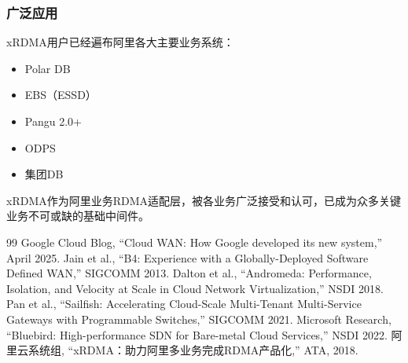\subsubsection{广泛应用}

xRDMA用户已经遍布阿里各大主要业务系统：
\begin{itemize}
    \item Polar DB
    \item EBS（ESSD）
    \item Pangu 2.0+
    \item ODPS
    \item 集团DB
\end{itemize}

xRDMA作为阿里业务RDMA适配层，被各业务广泛接受和认可，已成为众多关键业务不可或缺的基础中间件。

\begin{thebibliography}{99}
 Google Cloud Blog, ``Cloud WAN: How Google developed its new system,'' April 2025.
 Jain et al., ``B4: Experience with a Globally-Deployed Software Defined WAN,'' SIGCOMM 2013.
 Dalton et al., ``Andromeda: Performance, Isolation, and Velocity at Scale in Cloud Network Virtualization,'' NSDI 2018.
 Pan et al., ``Sailfish: Accelerating Cloud-Scale Multi-Tenant Multi-Service Gateways with Programmable Switches,'' SIGCOMM 2021.
 Microsoft Research, ``Bluebird: High-performance SDN for Bare-metal Cloud Services,'' NSDI 2022.
 阿里云系统组, ``xRDMA：助力阿里多业务完成RDMA产品化,'' ATA, 2018.
\end{thebibliography}
